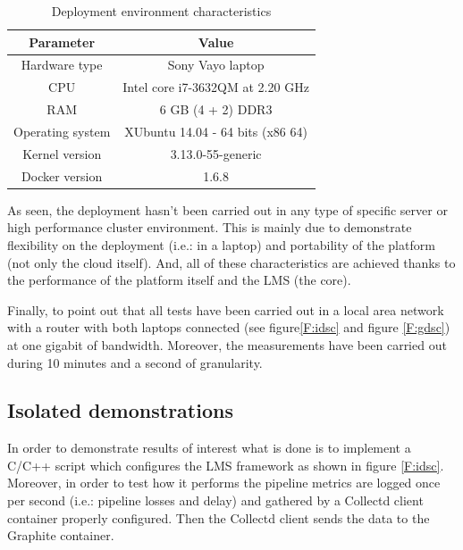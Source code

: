 \begin{table}[htb]
\caption{Deployment environment characteristics}
\begin{center}
\begin{tabular}{|c|c|}
\hline
{\bf Parameter} & {\bf Value} \\ \hline \hline
Hardware type        & Sony Vayo laptop \\ \hline
CPU        & Intel core i7-3632QM at 2.20 GHz  \\ \hline
RAM        & 6 GB (4 + 2) DDR3 \\ \hline
Operating system        & XUbuntu 14.04 - 64 bits (x86 64)  \\ \hline
Kernel version        & 3.13.0-55-generic  \\ \hline
Docker version        & 1.6.8  \\ \hline
\end{tabular}
\label{T:dec}
\end{center}
\end{table}

As seen, the deployment hasn't been carried out in any type of specific server or high performance cluster environment. This is mainly due to demonstrate flexibility on the deployment (i.e.: in a laptop) and portability of the platform (not only the cloud itself). And, all of these characteristics are achieved thanks to the performance of the platform itself and the LMS (the core).

Finally, to point out that all tests have been carried out in a local area network with a router with both laptops connected (see figure\ref{F:idsc} and figure \ref{F:gdsc}) at one gigabit of bandwidth. Moreover, the measurements have been carried out during 10 minutes and a second of granularity.

\subsection{Isolated demonstrations}

In order to demonstrate results of interest what is done is to implement a C/C++ script which configures the LMS framework as shown in figure \ref{F:idsc}. Moreover, in order to test how it performs the pipeline metrics are logged once per second (i.e.: pipeline losses and delay) and gathered by a Collectd client container properly configured. Then the Collectd client sends the data to the Graphite container. 

